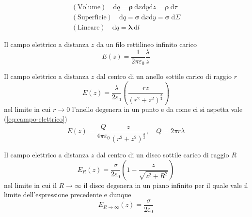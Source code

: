 \begin{multicols}{3}
  \begin{equation}
    \label{eq:densita-di-carica}
    \begin{gathered}
      (\text{Volume}) \quad \text{d}q = \boldsymbol{\rho}~\text{d}x\text{d}y\text{d}z = \boldsymbol{\rho}~\text{d}\tau \\
      (\text{Superficie}) \quad \text{d}q = \boldsymbol{\sigma}~\text{d}x\text{d}y = \boldsymbol{\sigma}~\text{d}\Sigma \\
      (\text{Lineare}) \quad \text{d}q = \boldsymbol{\lambda}~\text{d}l
    \end{gathered}
  \end{equation}

  Il campo elettrico a distanza $z$ da un filo rettilineo infinito carico
  \begin{equation}
    \label{eq:filo-infinito}
    E(z) = \frac{1}{2\pi\varepsilon_0}\frac{\lambda}{z}
  \end{equation}

  Il campo elettrico a distanza $z$ dal centro di un anello sottile carico di
  raggio $r$
  \begin{equation}
    \label{eq:anello-sottile-carico}
    E(z) = \frac{\lambda}{2\varepsilon_0}\left(
      \frac{rz}{(r^2+z^2)^{\frac{3}{2}}}
    \right)
  \end{equation}
  nel limite in cui $r\to 0$ l'anello degenera in un punto e da come ci si
  aspetta vale (\ref{eq:campo-elettrico})
  \begin{equation*}
    E(z) = \frac{Q}{4\pi\varepsilon_0}\frac{z}{(r^2+z^2)^{\frac{3}{2}}}, \quad
    Q = 2\pi r \lambda
  \end{equation*}


  Il campo elettrico a distanza $z$ dal centro di un disco sottile carico di
  raggio $R$
  \begin{equation}
    \label{eq:disco-sottile-carico}
    E_R(z) = \frac{\sigma}{2\varepsilon_0}\left(
      1 - \frac{z}{\sqrt{z^2 + R^2}}
    \right)
  \end{equation}
  nel limite in cui il $R \to \infty$ il disco degenera in un piano infinito
  per il quale vale il limite dell'espressione precedente e dunque
  \begin{equation}
    \label{eq:piano-infinito-carico}
    E_{R\to\infty}(z) = \frac{\sigma}{2\varepsilon_0}
  \end{equation}


\end{multicols}
